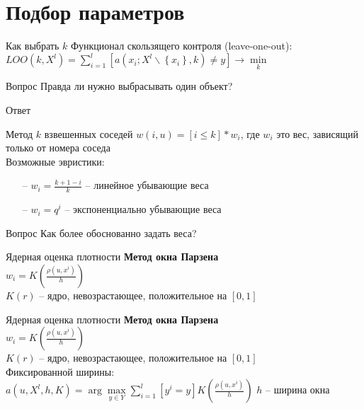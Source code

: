 \documentclass[10pt]{beamer}
\begin{document}
\section{Подбор параметров}

\begin{frame}{Как выбрать $k$}
	Функционал скользящего контроля (leave-one-out):\\
	${LOO(k, X^l) = \sum\limits_{i=1}^l [a(x_i; X^l \backslash \left\{x_i\right\}, k) \neq y] \rightarrow \min\limits_k}$\\
\end{frame}

\begin{frame}{Вопрос}
	Правда ли нужно выбрасывать один объект?
\end{frame}

\begin{frame}{Ответ}
\end{frame}

\begin{frame}{Метод $k$ взвешенных соседей}
	${w(i,u) = [i \leq k] * w_i}$, где $w_i$ это вес, зависящий только от номера соседа\\
	\bigbreak
	Возможные эвристики:\\
	\begin{itemize} [<+- | alert@+>]
	\item[--] ${w_i = \frac{k+1-i}{k}}$ -- линейное убывающие веса\\ %
	\item[--] ${w_i = q^i}$ -- экспоненциально убывающие веса\\
	\end{itemize}
\end{frame}

\begin{frame}{Вопрос}
	Как более обоснованно задать веса?\\
\end{frame}

\begin{frame}{Ядерная оценка плотности}
	\textbf{Метод окна Парзена}\\
	${w_i = K(\frac{\rho(u, x^i)}{h})}$\\
	$K(r)$ -- ядро, невозрастающее, положительное на ${[0, 1]}$\\
\end{frame}

\begin{frame}{Ядерная оценка плотности}
	\textbf{Метод окна Парзена}\\
	${w_i = K(\frac{\rho(u, x^i)}{h})}$\\
	$K(r)$ -- ядро, невозрастающее, положительное на ${[0, 1]}$\\
  \bigbreak
	Фиксированной ширины:\\
	${a(u, X^l, h, K) = \arg\max\limits_{y \in Y} \sum\limits_{i=1}^l [y^i = y] K(\frac{\rho(u, x^i)}{h})}$ \hspace{5mm} $h$ -- ширина окна\\
\end{frame}
\end{document}
